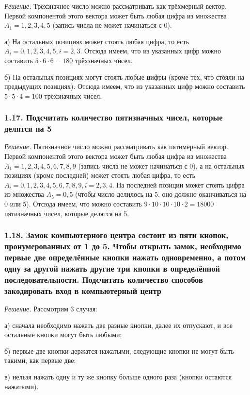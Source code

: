 \documentclass{book}
\begin{document}
\textit{Решение.} Трёхзначное число можно рассматривать как трёхмерный вектор. Первой компонентой этого вектора может быть любая цифра из множества $A_1={1, 2, 3, 4, 5}$ (запись числа не может начинаться с 0).

а) На остальных позициях может стоять любая цифра, то есть $A_i={0, 1, 2, 3, 4, 5}, i=2, 3$. Отсюда имеем, что из указанных цифр можно составить $5\cdot 6\cdot 6=180$ трёхзначных чисел.

б) На остальных позициях могут стоять любые цифры (кроме тех, что стояли на предыдущих позициях). Отсюда имеем, что из указанных цифр можно составить $5\cdot 5\cdot 4=100$ трёхзначных чисел.

\subsubsection*{1.17. Подсчитать количество пятизначных чисел, которые делятся на 5}

\textit{Решение.} Пятизначное число можно рассматривать как пятимерный вектор. Первой компонентой этого вектора может быть любая цифра из множества $A_1={1, 2, 3, 4, 5, 6, 7, 8, 9}$ (запись числа не может начинаться с 0), а на остальных позициях (кроме последней) может стоять любая цифра, то есть $A_i={0, 1, 2, 3, 4, 5, 6, 7, 8, 9}, i=2, 3, 4$. На последней позиции может стоять цифра из множества $A_5={0, 5}$ (чтобы число делилось на 5, оно должно оканчиваться на 0 или 5). Отсюда имеем, что можно составить $9\cdot 10\cdot 10\cdot 10\cdot 2=18000$ пятизначных чисел, которые делятся на 5.

\subsubsection*{1.18. Замок компьютерного центра состоит из пяти кнопок, пронумерованных от 1 до 5. Чтобы открыть замок, необходимо первые две определённые кнопки нажать одновременно, а потом одну за другой нажать другие три кнопки в определённой последовательности. Подсчитать количество способов закодировать вход в компьютерный центр}

\textit{Решение.} Рассмотрим 3 случая: 

а) сначала необходимо нажать две разные кнопки, далее их отпускают, и все остальные кнопки могут быть любыми; 

б) первые две кнопки держатся нажатыми, следующие кнопки не могут быть такими, как первые две; 

в) нельзя нажать одну и ту же кнопку больше одного раза (кнопки остаются нажатыми).
\end{document}

